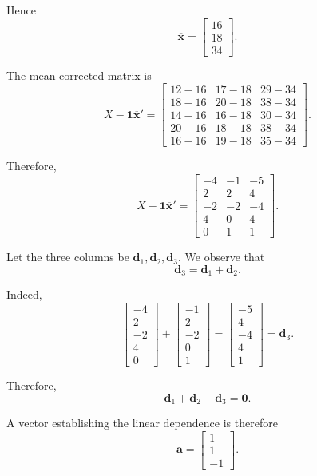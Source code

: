\documentclass[12pt,a4paper]{article}
\newcommand{\one}{\mathbf{1}}
\begin{document}
Hence
\[
\overline{\mathbf{x}}
=
\begin{bmatrix}
16\\18\\34
\end{bmatrix}.
\]

The mean-corrected matrix is
\[
X-\one\overline{\mathbf{x}}'
=
\begin{bmatrix}
12-16&17-18&29-34\\
18-16&20-18&38-34\\
14-16&16-18&30-34\\
20-16&18-18&38-34\\
16-16&19-18&35-34
\end{bmatrix}.
\]

Therefore,
\[
\boxed{
X-\one\overline{\mathbf{x}}'
=
\begin{bmatrix}
-4&-1&-5\\
2&2&4\\
-2&-2&-4\\
4&0&4\\
0&1&1
\end{bmatrix}}.
\]

Let the three columns be \(\mathbf{d}_1,\mathbf{d}_2,\mathbf{d}_3\). We observe that
\[
\mathbf{d}_3=\mathbf{d}_1+\mathbf{d}_2.
\]

Indeed,
\[
\begin{bmatrix}
-4\\2\\-2\\4\\0
\end{bmatrix}
+
\begin{bmatrix}
-1\\2\\-2\\0\\1
\end{bmatrix}
=
\begin{bmatrix}
-5\\4\\-4\\4\\1
\end{bmatrix}
=
\mathbf{d}_3.
\]

Therefore,
\[
\mathbf{d}_1+\mathbf{d}_2-\mathbf{d}_3=\mathbf{0}.
\]

A vector establishing the linear dependence is therefore
\[
\boxed{
\mathbf{a}
=
\begin{bmatrix}
1\\1\\-1
\end{bmatrix}}.
\]
\end{document}
